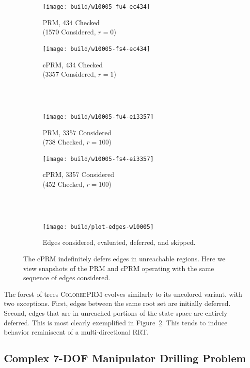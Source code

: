 \begin{figure}[t]
\centering
\begin{subfigure}[b]{.49\linewidth}
\centering
\texttt{[image: build/w10005-fu4-ec434]}
\caption{PRM, 434 Checked\\(1570 Considered, $r=0$)}
\end{subfigure}
\begin{subfigure}[b]{.49\linewidth}
\centering
\texttt{[image: build/w10005-fs4-ec434]}
\caption{cPRM, 434 Checked\\(3357 Considered, $r=1$)}
\end{subfigure}
\\ \quad \\
\begin{subfigure}[b]{.49\linewidth}
\centering
\texttt{[image: build/w10005-fu4-ei3357]}
\caption{PRM, 3357 Considered\\(738 Checked, $r=100$)}
\end{subfigure}
\begin{subfigure}[b]{.49\linewidth}
\centering
\texttt{[image: build/w10005-fs4-ei3357]}
\caption{cPRM, 3357 Considered\\(452 Checked, $r=100$)}
\end{subfigure}
\\ \quad \\
\begin{subfigure}[b]{\linewidth}
\centering
\texttt{[image: build/plot-edges-w10005]}
\caption{Edges considered, evaluated, deferred, and skipped.}
\label{subfig:results}
\end{subfigure}
\caption{The cPRM indefinitely defers edges in unreachable regions.
Here we view snapshots of the PRM and cPRM operating with the same sequence
of edges considered.}
\label{fig:unreachable}
\end{figure}

The forest-of-trees \textsc{ColoredPRM}
evolves similarly to its uncolored variant,
with two exceptions.
First, edges between the same root set are initially deferred.
Second, edges that are in unreached portions of the state space
are entirely deferred.
This is most clearly exemplified in Figure~\ref{fig:unreachable}.
This tends to induce behavior reminiscent of a multi-directional RRT.

\subsection{Complex 7-DOF Manipulator Drilling Problem}


